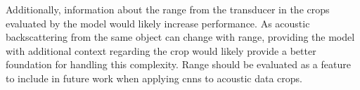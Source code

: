     
    
    


    Additionally, information about the range from the transducer in the crops evaluated by the model would likely increase performance. As acoustic backscattering from the same object can change with range, providing the model with additional context regarding the crop would likely provide a better foundation for handling this complexity. Range should be evaluated as a feature to include in future work when applying \gls{cnn}s to acoustic data crops. 

